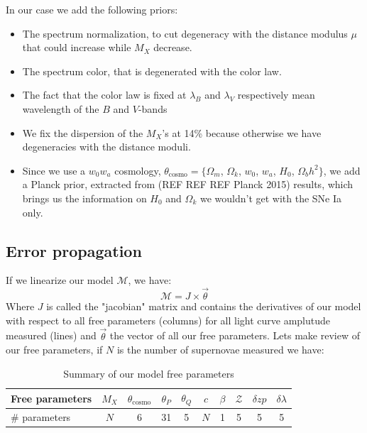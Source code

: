 \documentclass[\docopts]{\docclass}
\begin{document}
In our case we add the following priors:
\begin{itemize}
\item The spectrum normalization, to cut degeneracy with the distance modulus $\mu$ that could increase while $M_X$ decrease.
\item The spectrum color, that is degenerated with the color law.
\item The fact that the color law is fixed at $\lambda_B$ and $\lambda_V$ respectively mean wavelength of the $B$ and $V$-bands
\item We fix the dispersion of the $M_X$'s at 14\% because otherwise we have degeneracies with the distance moduli.
\item Since we use a $w_0w_a$ cosmology, $\theta_\text{cosmo} = \{ \Omega_m$, $\Omega_k$, $w_0$, $w_a$, $H_0$, $\Omega_bh^2 \}$, we add a Planck prior, extracted from (REF REF REF Planck 2015) results, which brings us the information on $H_0$ and $\Omega_k$ we wouldn't get with the SNe Ia only.
\end{itemize}



\subsection{Error propagation}
\label{sec::linalg}

If we linearize our model $\mathcal{M}$, we have:
\begin{equation}
\mathcal{M} = J \times \vec\theta
\end{equation}
Where $J$ is called the "jacobian" matrix and contains the derivatives of our model with respect to all free parameters (columns) for all light curve amplutude measured (lines) and $\vec\theta$ the vector of all our free parameters.
Lets make review of our free parameters, if $N$ is the number of supernovae measured we have:

\begin{table}[t]
\begin{center}
\caption{Summary of our model free parameters}
\begin{tabular}{l|ccccccccc}
\hline
\hline
Free parameters & $M_X$ & $\theta_\text{cosmo}$ & $\theta_P$ & $\theta_Q$ & $c$ & $\beta$ & $\mathcal{Z}$ & $\delta zp$ & $\delta \lambda$ \\
\hline
\# parameters & $N$ & 6 & 31 & 5 & $N$ & 1 & 5 & 5 & 5 \\
\hline
\end{tabular}
\end{center}
\end{table}
\end{document}
